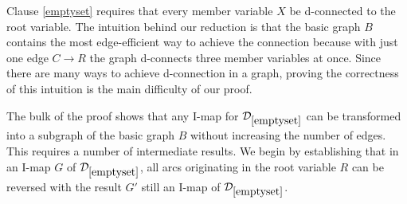 \documentclass{elsarticle}%
\DeclareMathOperator{\Par}{Par}
\newcommand{\D}{\mathcal{D}}
\begin{document}
%
Clause \ref{emptyset} requires that every member variable $X$ be d-connected to the root
variable. The intuition behind our reduction is that the basic graph $B$ contains the most
edge-efficient way to achieve the connection because with just one edge
$C \rightarrow R$ the graph d-connects three member variables at once. Since there are many
ways to achieve d-connection in a graph, proving the correctness of this
intuition is the main difficulty of our proof. 

The bulk of the proof shows that any I-map for $\D_{\ref{emptyset}}$ can be
transformed into a subgraph of the basic graph 
$B$ without increasing the number of edges. This requires a number of intermediate results. %
We begin by establishing that in an I-map $G$ of $\D_{\ref{emptyset}}$, all arcs originating in the root variable $R$ can be reversed with the result $G'$ still an I-map of $\D_{\ref{emptyset}}$.



\end{document}
